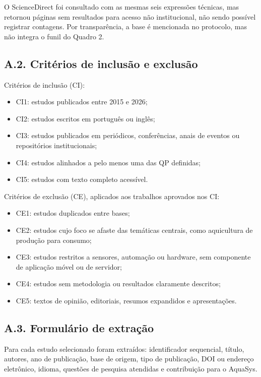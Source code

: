 \documentclass[12pt,oneside,a4paper,brazilian]{abntex2}
\begin{document}
O ScienceDirect foi consultado com as mesmas seis expressões técnicas, mas retornou páginas sem resultados para acesso não institucional, não sendo possível registrar contagens. Por transparência, a base é mencionada no protocolo, mas não integra o funil do Quadro 2.


\subsection*{A.2. Critérios de inclusão e exclusão}
Critérios de inclusão (CI):

\begin{itemize}
  \item CI1: estudos publicados entre 2015 e 2026;
  \item CI2: estudos escritos em português ou inglês;
  \item CI3: estudos publicados em periódicos, conferências, anais de eventos ou repositórios institucionais;
  \item CI4: estudos alinhados a pelo menos uma das QP definidas;
  \item CI5: estudos com texto completo acessível.
\end{itemize}
Critérios de exclusão (CE), aplicados aos trabalhos aprovados nos CI:

\begin{itemize}
  \item CE1: estudos duplicados entre bases;
  \item CE2: estudos cujo foco se afaste das temáticas centrais, como aquicultura de produção para consumo;
  \item CE3: estudos restritos a sensores, automação ou hardware, sem componente de aplicação móvel ou de servidor;
  \item CE4: estudos sem metodologia ou resultados claramente descritos;
  \item CE5: textos de opinião, editoriais, resumos expandidos e apresentações.
\end{itemize}

\subsection*{A.3. Formulário de extração}
Para cada estudo selecionado foram extraídos: identificador sequencial, título, autores, ano de publicação, base de origem, tipo de publicação, DOI ou endereço eletrônico, idioma, questões de pesquisa atendidas e contribuição para o AquaSys.
\end{document}
